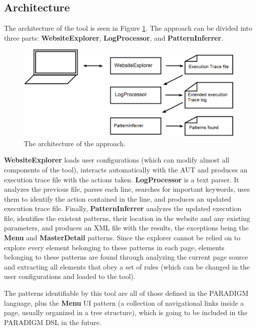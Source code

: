 \documentclass[9pt,a4paper]{extarticle}
\begin{document}
\begin{multicols}{2}
\subsection{Architecture}

The architecture of the tool is seen in Figure \ref{fig:retool}. The approach can be divided into three parts: \textbf{WebsiteExplorer}, \textbf{LogProcessor}, and \textbf{PatternInferrer}.
\begin{figure}[H]
\centerline{\includegraphics[scale=.3]{retool}}
\caption{The architecture of the approach.}
\label{fig:retool}
\end{figure}
\textbf{WebsiteExplorer} loads user configurations (which can modify almost all components of the tool), interacts automatically with the AUT and produces an execution trace file with the actions taken. \textbf{LogProcessor} is a text parser. It analyzes the previous file, parses each line, searches for important keywords, uses them to identify the action contained in the line, and produces an updated execution trace file. Finally, \textbf{PatternInferrer} analyzes the updated execution file, identifies the existent patterns, their location in the website and any existing parameters, and produces an XML file with the results, the exceptions being the \textbf{Menu} and \textbf{MasterDetail} patterns. Since the explorer cannot be relied on to explore every element belonging to these patterns in each page, elements belonging to these patterns are found through analyzing the current page source and extracting all elements that obey a set of rules (which can be changed in the user configurations and loaded to the tool).

The patterns identifiable by this tool are all of those defined in the PARADIGM language, plus the \textbf{Menu} UI pattern (a collection of navigational links inside a page, usually organized in a tree structure), which is going to be included in the PARADIGM DSL in the future. 


\end{multicols}
\end{document}
